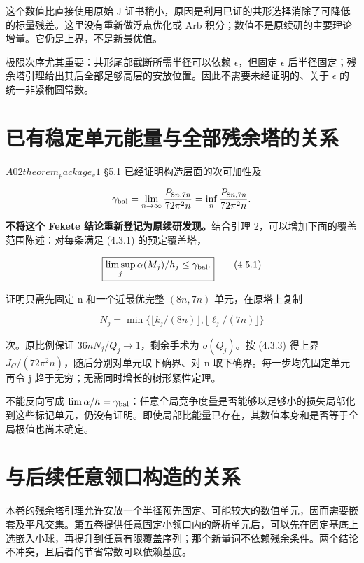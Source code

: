 \documentclass[UTF8,11pt,openany,fontset=none]{ctexbook}
\theoremstyle{definition}
\theoremstyle{remark}
\begin{document}
这个数值比直接使用原始 J 证书稍小，原因是利用已证的共形选择消除了可降低的标量残差。这里没有重新做浮点优化或 Arb 积分；数值不是原续研的主要理论增量。它仍是上界，不是新最优值。

极限次序尤其重要：共形尾部截断所需半径可以依赖 \(\epsilon\)，但固定 \(\epsilon\) 后半径固定；残余塔引理给出其后全部足够高层的安放位置。因此不需要未经证明的、关于 \(\epsilon\) 的统一非紧椭圆常数。

\section{已有稳定单元能量与全部残余塔的关系}\label{v4-ux5df2ux6709ux7a33ux5b9aux5355ux5143ux80fdux91cfux4e0eux5168ux90e8ux6b8bux4f59ux5854ux7684ux5173ux7cfb}

\(A02 theorem_package_v1\) §5.1 已经证明构造层面的次可加性及

\[
\gamma_{\rm bal}
=\lim_{n\to\infty}\frac{\mathfrak P_{8n,7n}}{72\pi^2n}
=\inf_n\frac{\mathfrak P_{8n,7n}}{72\pi^2n}.
\]

\textbf{不将这个 Fekete 结论重新登记为原续研发现。}结合引理 2，可以增加下面的覆盖范围陈述：对每条满足 (4.3.1) 的预定覆盖塔，

\[
\boxed{\limsup_j\alpha(M_j)/h_j\le\gamma_{\rm bal}.}
\tag{4.5.1}
\]

证明只需先固定 n 和一个近最优完整 \((8n,7n)\)-单元，在原塔上复制

\[
N_j=\min\{\lfloor k_j/(8n)\rfloor,\lfloor\ell_j/(7n)\rfloor\}
\]

次。原比例保证 \(36nN_j/Q_j\to1\)，剩余手术为 \(o(Q_j)\)。按 (4.3.3) 得上界 \(J_C/(72\pi^2n)\)，随后分别对单元取下确界、对 n 取下确界。每一步均先固定单元再令 j 趋于无穷；无需同时增长的树形紧性定理。

不能反向写成 \(\lim\alpha/h=\gamma_{\rm bal}\)：任意全局竞争度量是否能够以足够小的损失局部化到这些标记单元，仍没有证明。即使局部比能量已存在，其数值本身和是否等于全局极值也尚未确定。

\section{与后续任意领口构造的关系}\label{v4-ux4e0eux540eux7eedux4efbux610fux9886ux53e3ux6784ux9020ux7684ux5173ux7cfb}

本卷的残余塔引理允许安放一个半径预先固定、可能较大的数值单元，因而需要嵌套及平凡交集。第五卷提供任意固定小领口内的解析单元后，可以先在固定基底上选嵌入小球，再提升到任意有限覆盖序列；那个新量词不依赖残余条件。两个结论不冲突，且后者的节省常数可以依赖基底。
\end{document}
